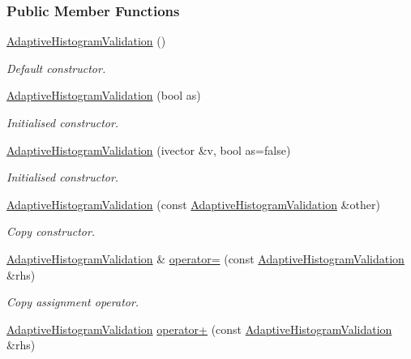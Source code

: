 \subsubsection*{\-Public \-Member \-Functions}
\begin{DoxyCompactItemize}
\item 
\hyperlink{classsubpavings_1_1AdaptiveHistogramValidation_ae0f0cb633c516b90444862c87eef424c}{\-Adaptive\-Histogram\-Validation} ()
\begin{DoxyCompactList}\small\item\em \-Default constructor. \end{DoxyCompactList}\item 
\hyperlink{classsubpavings_1_1AdaptiveHistogramValidation_a07760421ee7a7bdf1d38cf29a1ebf5c8}{\-Adaptive\-Histogram\-Validation} (bool as)
\begin{DoxyCompactList}\small\item\em \-Initialised constructor. \end{DoxyCompactList}\item 
\hyperlink{classsubpavings_1_1AdaptiveHistogramValidation_a3ef9f2889ef3bde29457990c210094e9}{\-Adaptive\-Histogram\-Validation} (ivector \&v, bool as=false)
\begin{DoxyCompactList}\small\item\em \-Initialised constructor. \end{DoxyCompactList}\item 
\hyperlink{classsubpavings_1_1AdaptiveHistogramValidation_a899983cbb878e24d4e3d7e54601b7dd2}{\-Adaptive\-Histogram\-Validation} (const \hyperlink{classsubpavings_1_1AdaptiveHistogramValidation}{\-Adaptive\-Histogram\-Validation} \&other)
\begin{DoxyCompactList}\small\item\em \-Copy constructor. \end{DoxyCompactList}\item 
\hyperlink{classsubpavings_1_1AdaptiveHistogramValidation}{\-Adaptive\-Histogram\-Validation} \& \hyperlink{classsubpavings_1_1AdaptiveHistogramValidation_aba8d900d6f696824de3e6cb5bb99e794}{operator=} (const \hyperlink{classsubpavings_1_1AdaptiveHistogramValidation}{\-Adaptive\-Histogram\-Validation} \&rhs)
\begin{DoxyCompactList}\small\item\em \-Copy assignment operator. \end{DoxyCompactList}\item 
\hyperlink{classsubpavings_1_1AdaptiveHistogramValidation}{\-Adaptive\-Histogram\-Validation} \hyperlink{classsubpavings_1_1AdaptiveHistogramValidation_ad3d12ca5330306b377001a4064599430}{operator+} (const \hyperlink{classsubpavings_1_1AdaptiveHistogramValidation}{\-Adaptive\-Histogram\-Validation} \&rhs)

\end{DoxyCompactItemize}
